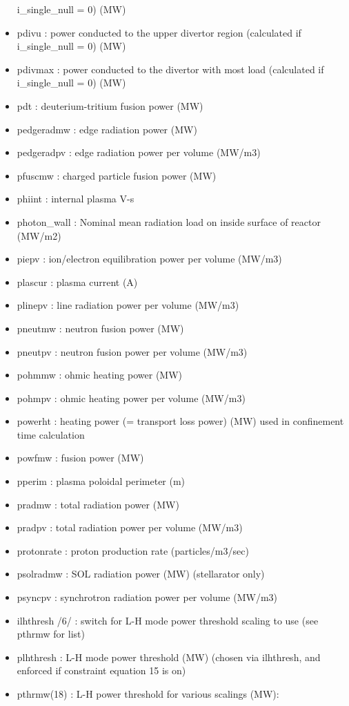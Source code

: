 \documentclass[]{article}
\begin{document}
\begin{itemize}
  i_single_null = 0) (MW)
\item
  pdivu : power conducted to the upper divertor region (calculated if
  i_single_null = 0) (MW)
\item
  pdivmax : power conducted to the divertor with most load (calculated
  if i_single_null = 0) (MW)
\item
  pdt : deuterium-tritium fusion power (MW)
\item
  pedgeradmw : edge radiation power (MW)
\item
  pedgeradpv : edge radiation power per volume (MW/m3)
\item
  pfuscmw : charged particle fusion power (MW)
\item
  phiint : internal plasma V-s
\item
  photon\_wall : Nominal mean radiation load on inside surface of
  reactor (MW/m2)
\item
  piepv : ion/electron equilibration power per volume (MW/m3)
\item
  plascur : plasma current (A)
\item
  plinepv : line radiation power per volume (MW/m3)
\item
  pneutmw : neutron fusion power (MW)
\item
  pneutpv : neutron fusion power per volume (MW/m3)
\item
  pohmmw : ohmic heating power (MW)
\item
  pohmpv : ohmic heating power per volume (MW/m3)
\item
  powerht : heating power (= transport loss power) (MW) used in
  confinement time calculation
\item
  powfmw : fusion power (MW)
\item
  pperim : plasma poloidal perimeter (m)
\item
  pradmw : total radiation power (MW)
\item
  pradpv : total radiation power per volume (MW/m3)
\item
  protonrate : proton production rate (particles/m3/sec)
\item
  psolradmw : SOL radiation power (MW) (stellarator only)
\item
  psyncpv : synchrotron radiation power per volume (MW/m3)
\item
  ilhthresh /6/ : switch for L-H mode power threshold scaling to use
  (see pthrmw for list)
\item
  plhthresh : L-H mode power threshold (MW) (chosen via ilhthresh, and
  enforced if constraint equation 15 is on)
\item
  pthrmw(18) : L-H power threshold for various scalings (MW):


\end{itemize}
\end{document}
